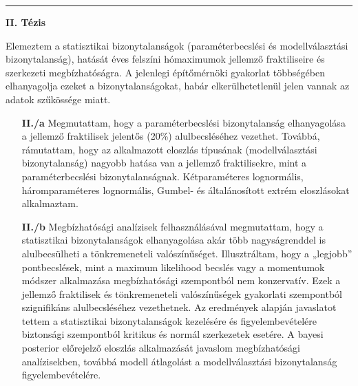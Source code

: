 \begin{otherlanguage}{hungarian}
\begin{center}
	\noindent\rule[0.5ex]{0.5\linewidth}{0.5pt}
	\item[\textbf{II. Tézis}] \hfill
\end{center}
Elemeztem a statisztikai bizonytalanságok (paraméterbecslési és modellválasztási bizonytalanság), hatását éves felszíni hómaximumok jellemző fraktiliseire és szerkezeti megbízhatóságra. A jelenlegi építőmérnöki gyakorlat többségében elhanyagolja ezeket a bizonytalanságokat, habár elkerülhetetlenül jelen vannak az adatok szűkössége miatt.
\begin{enumerate}[leftmargin=*, align=left, labelwidth=*]
	\item[\textbf{II./a}] Megmutattam, hogy a paraméterbecslési bizonytalanság elhanyagolása a jellemző fraktilisek jelentős (20\%) alulbecsléséhez vezethet. Továbbá, rámutattam, hogy az alkalmazott eloszlás típusának (modellválasztási bizonytalanság) nagyobb hatása van a jellemző fraktilisekre, mint a paraméterbecslési bizonytalanságnak. Kétparaméteres lognormális, háromparaméteres lognormális, Gumbel- és általánosított extrém eloszlásokat alkalmaztam.
	
	\item[\textbf{II./b}] Megbízhatósági analízisek felhasználásával megmutattam, hogy a statisztikai bizonytalanságok elhanyagolása akár több nagyságrenddel is alulbecsülheti a tönkremeneteli valószínűséget. Illusztráltam, hogy a „legjobb” pontbecslések, mint a maximum likelihood becslés vagy a momentumok módszer alkalmazása megbízhatósági szempontból nem konzervatív. Ezek a jellemző fraktilisek és tönkremeneteli valószínűségek gyakorlati szempontból szignifikáns alulbecsléséhez vezethetnek.
	Az eredmények alapján javaslatot tettem a statisztikai bizonytalanságok kezelésére és figyelembevételére biztonsági szempontból kritikus és normál szerkezetek esetére. A bayesi posterior előrejelző eloszlás alkalmazását javaslom megbízhatósági analízisekben, továbbá modell átlagolást a modellválasztási bizonytalanság figyelembevételére.
\end{enumerate}

\citep{RozsasEpistemic2014, RozsasESREL2015, RozsasIABSE2015, RozsasMM2015, RozsasTVSB2015, RozsasIdojaras2016}



\end{otherlanguage}
